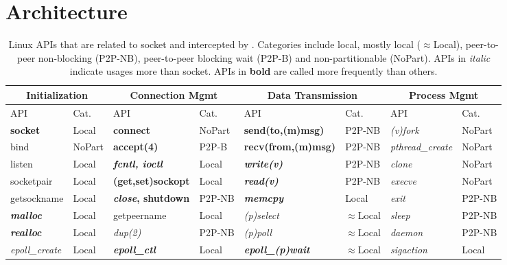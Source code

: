 \section{Architecture}
\label{sec:architecture}


\begin{table}[t]
	\centering
	\begin{tabular}{ll|ll|ll|ll}
		\hline
		\multicolumn{2}{c|}{Initialization} &
		\multicolumn{2}{c|}{Connection Mgmt} &
		\multicolumn{2}{c|}{Data Transmission} &
		\multicolumn{2}{c}{Process Mgmt} \\
		\hline
		API & Cat. &
		API & Cat. &
		API & Cat. &
		API & Cat. \\
		\hline
		\hline
		\textbf{socket} & Local &
		\textbf{connect} & NoPart &
		\textbf{send(to,(m)msg)} & P2P-NB &
		\textit{(v)fork} & NoPart \\
		\hline
		bind & NoPart &
		\textbf{accept(4)} & P2P-B &
		\textbf{recv(from,(m)msg)} & P2P-NB &
		\textit{pthread\_create} & NoPart \\
		\hline
		listen & Local &
		\textbf{\textit{fcntl, ioctl}} & Local &
		\textbf{\textit{write(v)}} & P2P-NB &
		\textit{clone} & NoPart \\
		\hline
		socketpair & Local &
		\textbf{(get,set)sockopt} & Local &
		\textbf{\textit{read(v)}} & P2P-NB &
		\textit{execve} & NoPart \\
		\hline
		getsockname  & Local &
		\textbf{\textit{close}, shutdown} & P2P-NB &
		\textbf{\textit{memcpy}} & Local &
		\textit{exit} & P2P-NB \\
		\hline
		\textbf{\textit{malloc}} & Local &
		getpeername & Local &
		\textit{(p)select} & $\approx$Local &
		\textit{sleep} & P2P-NB \\
		\hline
		\textbf{\textit{realloc}} & Local &
		\textit{dup(2)} & P2P-NB &
		\textit{(p)poll} & $\approx$Local &
		\textit{daemon} & P2P-NB \\
		\hline
		\textit{epoll\_create} & Local &
		\textbf{\textit{epoll\_ctl}} & Local &
		\textbf{\textit{epoll\_(p)wait}} & $\approx$Local &
		\textit{sigaction} & Local \\
		\hline
	\end{tabular}
	\caption{Linux APIs that are related to socket and intercepted by \libipc{}. Categories include local, mostly local ($\approx$Local), peer-to-peer non-blocking (P2P-NB), peer-to-peer blocking wait (P2P-B) and non-partitionable (NoPart). APIs in \textit{italic} indicate usages more than socket. APIs in \textbf{bold} are called more frequently than others.}
	\label{tab:socket-api}
\end{table}

